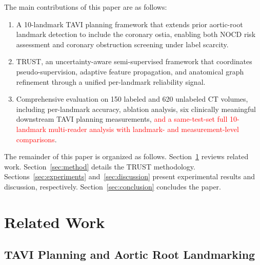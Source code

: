 \documentclass[conference]{IEEEtran}
\begin{document}
The main contributions of this paper are as follows:
\begin{enumerate}
  \item A 10-landmark TAVI planning framework that extends prior aortic-root landmark detection to include the coronary ostia, enabling both NOCD risk assessment and coronary obstruction screening under label scarcity.
  \item TRUST, an uncertainty-aware semi-supervised framework that coordinates pseudo-supervision, adaptive feature propagation, and anatomical graph refinement through a unified per-landmark reliability signal.
  \item Comprehensive evaluation on 150 labeled and 620 unlabeled CT volumes, including per-landmark accuracy, ablation analysis, six clinically meaningful downstream TAVI planning measurements, \textcolor{red}{and a same-test-set full 10-landmark multi-reader analysis with landmark- and measurement-level comparisons}.
\end{enumerate}

The remainder of this paper is organized as follows. Section~\ref{sec:related} reviews related work. Section~\ref{sec:method} details the TRUST methodology. Sections~\ref{sec:experiments} and~\ref{sec:discussion} present experimental results and discussion, respectively. Section~\ref{sec:conclusion} concludes the paper.

\section{Related Work}
\label{sec:related}

\subsection{TAVI Planning and Aortic Root Landmarking}
\end{document}
